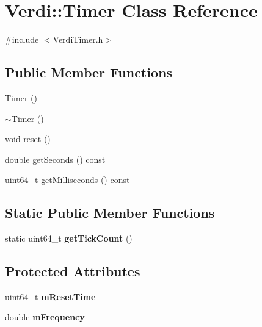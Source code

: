 \hypertarget{class_verdi_1_1_timer}{\section{\-Verdi\-:\-:\-Timer \-Class \-Reference}
\label{class_verdi_1_1_timer}
}


{\ttfamily \#include $<$\-Verdi\-Timer.\-h$>$}

\subsection*{\-Public \-Member \-Functions}
\begin{DoxyCompactItemize}
\item 
\hyperlink{class_verdi_1_1_timer_ae433ded73fd360dda5b9d4128e898acf}{\-Timer} ()
\item 
\hyperlink{class_verdi_1_1_timer_ad6c3f8ed231031b9484d40fb0bfd09bb}{$\sim$\-Timer} ()
\item 
void \hyperlink{class_verdi_1_1_timer_af1ab73370631c144379a6c1d07fa6525}{reset} ()
\item 
double \hyperlink{class_verdi_1_1_timer_a335af3d4af032dfad1ecaa75f13befdd}{get\-Seconds} () const 
\item 
uint64\-\_\-t \hyperlink{class_verdi_1_1_timer_a2bd1c8b39fd3610f7fe020895f118ca2}{get\-Milliseconds} () const 
\end{DoxyCompactItemize}
\subsection*{\-Static \-Public \-Member \-Functions}
\begin{DoxyCompactItemize}
\item 
\hypertarget{class_verdi_1_1_timer_a96a89472eb984fc75893a26138191a36}{static uint64\-\_\-t {\bfseries get\-Tick\-Count} ()}\label{class_verdi_1_1_timer_a96a89472eb984fc75893a26138191a36}

\end{DoxyCompactItemize}
\subsection*{\-Protected \-Attributes}
\begin{DoxyCompactItemize}
\item 
\hypertarget{class_verdi_1_1_timer_ae84da85660b235a696ce264e3f605b77}{uint64\-\_\-t {\bfseries m\-Reset\-Time}}\label{class_verdi_1_1_timer_ae84da85660b235a696ce264e3f605b77}

\item 
\hypertarget{class_verdi_1_1_timer_acb2d3f45eebcade0e618c6ae31c6ec6b}{double {\bfseries m\-Frequency}}\label{class_verdi_1_1_timer_acb2d3f45eebcade0e618c6ae31c6ec6b}

\end{DoxyCompactItemize}


